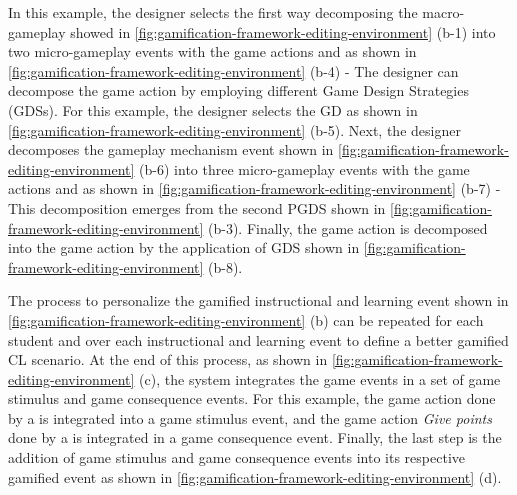 In this example, the designer selects the first way  decomposing the macro-gameplay showed in \autoref{fig:gamification-framework-editing-environment} (b-1) into two micro-gameplay events with the game actions  and  as shown in \autoref{fig:gamification-framework-editing-environment} (b-4) - 
The designer can decompose the game action  by employing different Game Design Strategies (GDSs).
For this example, the designer selects the GD  as shown in \autoref{fig:gamification-framework-editing-environment} (b-5).
Next, the designer decomposes the gameplay mechanism event shown in \autoref{fig:gamification-framework-editing-environment} (b-6) into three micro-gameplay events with the game actions   and  as shown in \autoref{fig:gamification-framework-editing-environment} (b-7) - 
This decomposition emerges from the second PGDS   shown in \autoref{fig:gamification-framework-editing-environment} (b-3).
Finally, the game action  is decomposed into the game action  by the application of GDS  shown in \autoref{fig:gamification-framework-editing-environment} (b-8).

The process to personalize the gamified instructional and learning event shown in \autoref{fig:gamification-framework-editing-environment} (b) can be repeated for each student and over each instructional and learning event to define a better gamified CL scenario.
At the end of this process, as shown in \autoref{fig:gamification-framework-editing-environment} (c), the system integrates the game events in a set of game stimulus and game consequence events.
For this example, the game action  done by a  is integrated into a game stimulus event, and the game action \emph{{Give points}} done by a  is integrated in a game consequence event.
Finally, the last step is the addition of game stimulus and game consequence events into its respective gamified event as shown in \autoref{fig:gamification-framework-editing-environment} (d).





